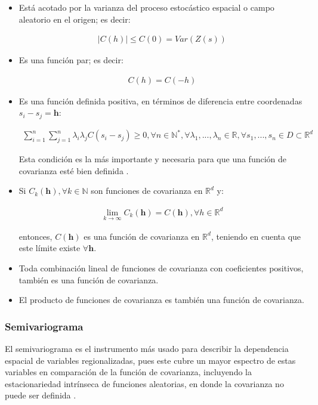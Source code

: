 \documentclass[
]{book}
\begin{document}
\begin{itemize}
\item
  Está acotado por la varianza del proceso estocástico espacial o campo aleatorio en el origen; es decir:

  \begin{align}
      |C(h)|\leq C(0)=Var(Z(s))  
    \end{align}
\item
  Es una función par; es decir:

  \begin{align}
      C(h)=C(-h)  
    \end{align}
\item
  Es una función definida positiva, en términos de diferencia entre coordenadas \(s_i-s_j=\textbf{h}\):

  \begin{align}
      \sum_{i=1}^n \sum_{j=1}^n\lambda_i \lambda_j C(s_i-s_j)\geq 0,\forall n\in \mathbb{N}^*,\forall \lambda_1,...,\lambda_n \in \mathbb{R}, \forall s_1,...,s_n\in D \subset \mathbb{R}^d  
    \end{align}

  Esta condición es la más importante y necesaria para que una función de covarianza esté bien definida \citep{montero}.
\item
  Si \(C_k(\textbf{h}),\forall k \in \mathbb{N}\) son funciones de covarianza en \(\mathbb{R}^d\) y:

  \begin{align}
      \lim_{k\to \infty}C_{k}(\textbf{h})=C(\textbf{h}),\forall h \in \mathbb{R}^d  
    \end{align}

  entonces, \(C(\textbf{h})\) es una función de covarianza en \(\mathbb{R}^d\), teniendo en cuenta que este límite existe \(\forall \textbf{h}\).
\item
  Toda combinación lineal de funciones de covarianza con coeficientes positivos, también es una función de covarianza.
\item
  El producto de funciones de covarianza es también una función de covarianza.
\end{itemize}

\hypertarget{semivariograma}{%
\subsubsection*{Semivariograma}\label{semivariograma}}

El semivariograma es el instrumento más usado para describir la dependencia espacial de variables regionalizadas, pues este cubre un mayor espectro de estas variables en comparación de la función de covarianza, incluyendo la estacionariedad intrínseca de funciones aleatorias, en donde la covarianza no puede ser definida \citep{montero}.
\end{document}
